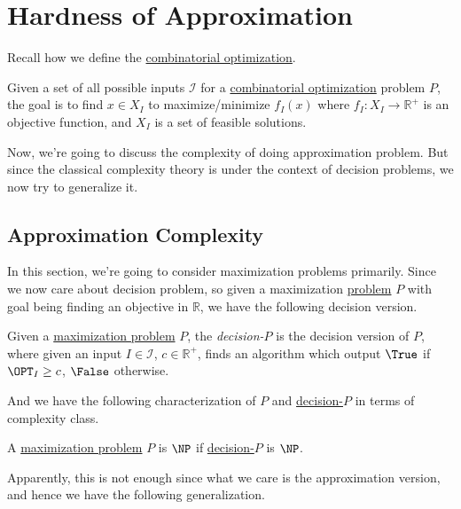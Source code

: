 \chapter{Hardness of Approximation}
Recall how we define the \hyperref[def:combinatorial-optimization]{combinatorial optimization}.

\begin{prev}
	Given a set of all possible inputs \(\mathcal{I} \) for a \hyperref[def:combinatorial-optimization]{combinatorial optimization} problem \(P\), the goal is to find \(x\in X_I\) to maximize/minimize \(f_I (x)\) where \(f_I \colon X_I \to \mathbb{R} ^+\) is an objective function, and \(X_I\) is a set of feasible solutions.
\end{prev}

Now, we're going to discuss the complexity of doing approximation problem. But since the classical complexity theory is under the context of decision problems, we now try to generalize it.

\section{Approximation Complexity}
In this section, we're going to consider maximization problems primarily. Since we now care about decision problem, so given a maximization \hyperref[def:combinatorial-optimization]{problem} \(P\) with goal being finding an objective in \(\mathbb{R} \), we have the following decision version.

\begin{definition}[Decision-\(P\)]\label{def:decision-P}
	Given a \hyperref[def:combinatorial-optimization]{maximization problem} \(P\), the \emph{decision-\(P\)} is the decision version of \(P\), where given an input \(I\in \mathcal{I} \), \(c\in \mathbb{R} ^+\), finds an algorithm which output \(\True\) if \(\OPT_I \geq c\), \(\False\) otherwise.
\end{definition}

And we have the following characterization of \(P\) and \hyperref[def:decision-P]{decision-\(P\)} in terms of complexity class.

\begin{definition}
	A \hyperref[def:combinatorial-optimization]{maximization problem} \(P\) is \(\NP\) if \hyperref[def:decision-P]{decision-\(P\)} is \(\NP\).
\end{definition}

Apparently, this is not enough since what we care is the approximation version, and hence we have the following generalization.

